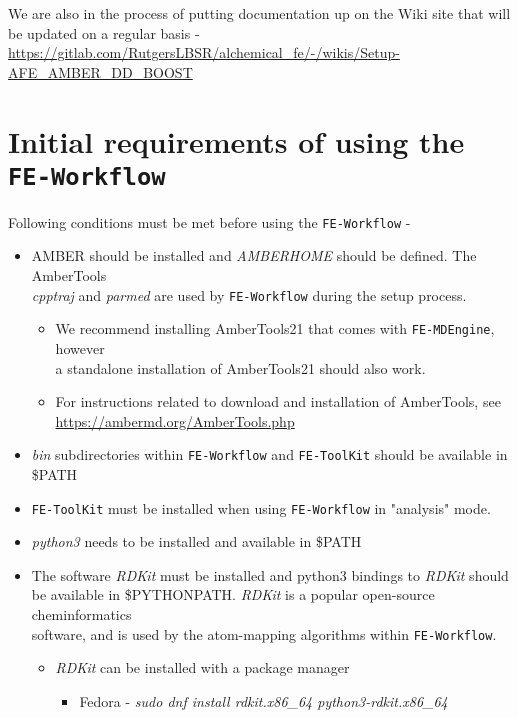 \documentclass[11pt,letterpaper,titlepage]{article}
\newcommand{\addb}{\texttt{FE-MDEngine}}
\newcommand{\tk}{\texttt{FE-ToolKit}}
\newcommand{\wf}{\texttt{FE-Workflow}}
\begin{document}

We are also in the process of putting documentation up on the Wiki site 
that will be updated on a regular basis
- \url{https://gitlab.com/RutgersLBSR/alchemical\_fe/-/wikis/Setup-AFE\_AMBER\_DD\_BOOST}


\vspace{0.1cm}
\section{Initial requirements of using the \wf{}}
\vspace{0.1cm}

Following conditions must be met before using the \wf{} -
\begin{itemize}
	\item{AMBER should be installed and \textit{AMBERHOME} should be defined. The AmberTools \\
		\textit{cpptraj} and \textit{parmed} are used by \wf{} during the setup process.}
		\begin{itemize}
			\item We recommend installing AmberTools21 that comes with \addb{}, however \\
				a standalone installation of AmberTools21 should also work.
			\item For instructions related to download and installation of AmberTools, see \\
				\url{https://ambermd.org/AmberTools.php}
		\end{itemize}
	\item{\textit{bin} subdirectories within \wf{} and \tk{} should be available in \$PATH}
	\item{\tk{} must be installed when using \wf{} in "analysis" mode.}
	\item{\textit{python3} needs to be installed and available in \$PATH}
	\item{The software \textit{RDKit} must be installed and python3 bindings to \textit{RDKit} should \\ 
		be available in \$PYTHONPATH. \textit{RDKit} is a popular open-source cheminformatics \\
		software, and is used by the atom-mapping algorithms within \wf{}.}
	\begin{itemize}
		\item{\textit{RDKit} can be installed with a package manager}
		\begin{itemize}
			\item{Fedora - \textit{sudo dnf install rdkit.x86\_64 python3-rdkit.x86\_64}}

\end{itemize}
\end{itemize}
\end{itemize}
\end{document}
